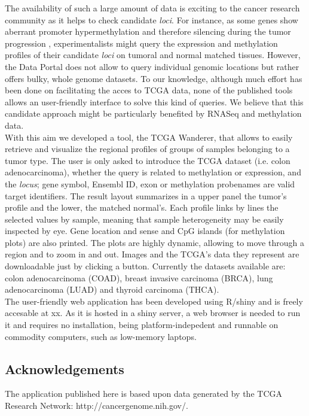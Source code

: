 \documentclass{article}
\begin{document}
The availability of such a large amount of data is exciting to the cancer research community as it helps to check candidate \textit{loci}. For instance, as some genes show aberrant promoter hypermethylation and therefore silencing during the tumor progression \cite{jones2002fundamental}, experimentalists might query the expression and methylation profiles of their candidate \textit{loci} on tumoral and normal matched tissues. However, the Data Portal does not allow to query individual genomic locations but rather offers bulky, whole genome datasets. To our knowledge, although much effort has been done on facilitating the acces to TCGA data, none of the published tools allows an user-friendly interface to solve this kind of queries. We believe that this candidate approach might be particularly benefited by RNASeq and methylation data.\\


With this aim we developed a tool, the TCGA Wanderer, that allows to easily retrieve and visualize the regional profiles of groups of samples belonging to a tumor type. The user is only asked to introduce the TCGA dataset (i.e. colon adenocarcinoma), whether the query is related to methylation or expression, and the \textit{locus}; gene symbol, Ensembl ID, exon or methylation probenames are valid target identifiers. The result layout summarizes in a upper panel the tumor's profile and the lower, the matched normal's. Each profile links by lines the selected values by sample, meaning that sample heterogeneity may be easily inspected by eye. Gene location and sense and CpG islands (for methylation plots) are also printed. The plots are highly dynamic, allowing to move through a region and to zoom in and out. Images and the TCGA's data they represent are downloadable just by clicking a button. Currently the datasets available are: colon adenocarcinoma (COAD), breast invasive carcinoma (BRCA), lung adenocarcinoma (LUAD) and thyroid carcinoma (THCA).  \\


The user-friendly web application has been developed using R/shiny and is freely accesable at xx. As it is hosted in a shiny server, a web browser is needed to run it and requires no installation, being platform-indepedent and runnable on commodity computers, such as low-memory laptops.\\

\subsection{Acknowledgements}
The application published here is based upon data generated by the TCGA Research Network: http://cancergenome.nih.gov/.
\end{document}
